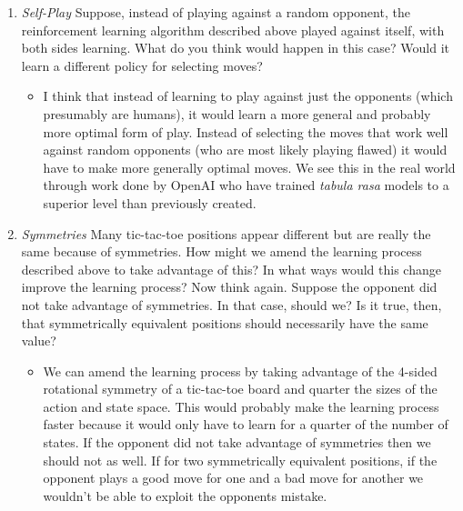 \documentclass{article}
\begin{document}
\maketitle

\begin{enumerate}
    \item \emph{Self-Play} Suppose, instead of playing against a random opponent, the reinforcement learning algorithm described above played against itself, with both sides learning. What do you think would happen in this case? Would it learn a different policy for selecting moves?
    \begin{itemize}
        \item I think that instead of learning to play against just the opponents (which presumably are humans), it would learn a more general and probably more optimal form of play. Instead of selecting the moves that work well against random opponents (who are most likely playing flawed) it would have to make more generally optimal moves. We see this in the real world through work done by OpenAI who have trained \emph{tabula rasa} models to a superior level than previously created.
    \end{itemize}
    
    \item \emph{Symmetries} Many tic-tac-toe positions appear different but are really the same because of symmetries. How might we amend the learning process described above to take advantage of this? In what ways would this change improve the learning process? Now think again. Suppose the opponent did not take advantage of symmetries. In that case, should we? Is it true, then, that symmetrically equivalent positions should necessarily have the same value?
    \begin{itemize}
        \item We can amend the learning process by taking advantage of the 4-sided rotational symmetry of a tic-tac-toe board and quarter the sizes of the action and state space. This would probably make the learning process faster because it would only have to learn for a quarter of the number of states. If the opponent did not take advantage of symmetries then we should not as well. If for two symmetrically equivalent positions, if the opponent plays a good move for one and a bad move for another we wouldn't be able to exploit the opponents mistake.
    \end{itemize}


\end{enumerate}
\end{document}
